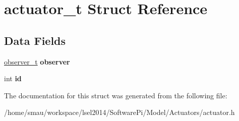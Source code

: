 \hypertarget{structactuator__t}{\section{actuator\-\_\-t Struct Reference}
\label{structactuator__t}
}
\subsection*{Data Fields}
\begin{DoxyCompactItemize}
\item 
\hypertarget{structactuator__t_a76e8fd03617d4a7e7ee24c03eb0addc4}{\hyperlink{structobserver__t}{observer\-\_\-t} {\bfseries observer}}\label{structactuator__t_a76e8fd03617d4a7e7ee24c03eb0addc4}

\item 
\hypertarget{structactuator__t_aa96a39724e4e363e56417d0580390f01}{int {\bfseries id}}\label{structactuator__t_aa96a39724e4e363e56417d0580390f01}

\end{DoxyCompactItemize}


The documentation for this struct was generated from the following file\-:\begin{DoxyCompactItemize}
\item 
/home/smau/workspace/lsel2014/\-Software\-Pi/\-Model/\-Actuators/actuator.\-h\end{DoxyCompactItemize}
